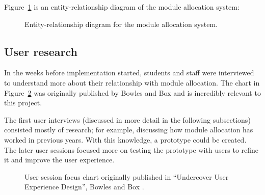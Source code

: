 \documentclass[]{scrartcl}
\begin{document}
Figure~\ref{er_diagram} is an entity-relationship diagram of the module
allocation system:

\begin{figure}
  \caption{Entity-relationship diagram for the module allocation system.}
  \label{er_diagram}
\end{figure}

\subsection{User research}

In the weeks before implementation started, students and staff were
interviewed to understand more about their relationship with module
allocation. The chart in Figure~\ref{bowles_dualpurpose_chart} was originally
published by Bowles and Box and is incredibly relevant to this project.

The first user interviews (discussed in more detail in the following
subsections) consisted mostly of research; for example, discussing how module
allocation has worked in previous years. With this knowledge, a prototype
could be created. The later user sessions focused more on testing the
prototype with users to refine it and improve the user experience.

\begin{figure}
  \begin{center}
  \end{center}
  \caption{User session focus chart originally published in
    ``Undercover User Experience Design'', Bowles and Box \cite{bowles2011undercover}.}
  \label{bowles_dualpurpose_chart}
\end{figure}
\end{document}
